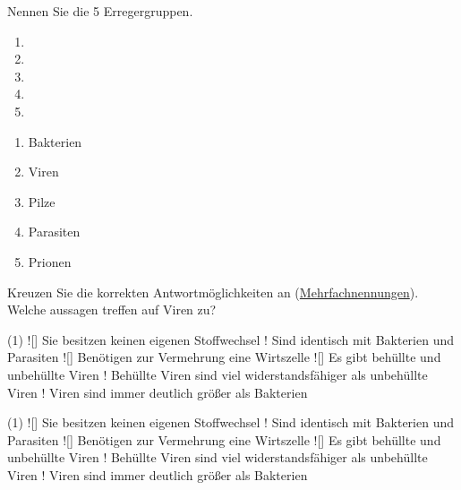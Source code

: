 \documentclass[a4paper]{scrartcl}
\begin{document}
\begin{aufgabe}{5}
	Nennen Sie die 5 Erregergruppen.
	\begin{center}
		\begin{enumerate}
			\item {}
			\item {}
			\item {}
			\item {}
			\item {}
		\end{enumerate}
	\end{center}
	
	\begin{loesung}
		\begin{enumerate}
			\item Bakterien
			\item Viren
			\item Pilze
			\item Parasiten
			\item Prionen
		\end{enumerate}
	\end{loesung}
\end{aufgabe}



\begin{aufgabe}{3}
	Kreuzen Sie die korrekten Antwortmöglichkeiten an (\underline{Mehrfachnennungen}). Welche aussagen treffen auf Viren zu?
	\begin{center}
		\begin{mcumgebung}(1)
			\choice![\mcrichtig] Sie besitzen keinen eigenen Stoffwechsel
			\choice! Sind identisch mit Bakterien und Parasiten
			\choice![\mcrichtig] Benötigen zur Vermehrung eine Wirtszelle
			\choice![\mcrichtig] Es gibt behüllte und unbehüllte Viren
			\choice! Behüllte Viren sind viel widerstandsfähiger als unbehüllte Viren
			\choice! Viren sind immer deutlich größer als Bakterien
		\end{mcumgebung}
	\end{center}
	
	\begin{loesung}
		\begin{mcumgebung}(1)
			\choice![\mcrichtig] Sie besitzen keinen eigenen Stoffwechsel
			\choice! Sind identisch mit Bakterien und Parasiten
			\choice![\mcrichtig] Benötigen zur Vermehrung eine Wirtszelle
			\choice![\mcrichtig] Es gibt behüllte und unbehüllte Viren
			\choice! Behüllte Viren sind viel widerstandsfähiger als unbehüllte Viren
			\choice! Viren sind immer deutlich größer als Bakterien
		\end{mcumgebung}
	\end{loesung}
\end{aufgabe}
\end{document}
